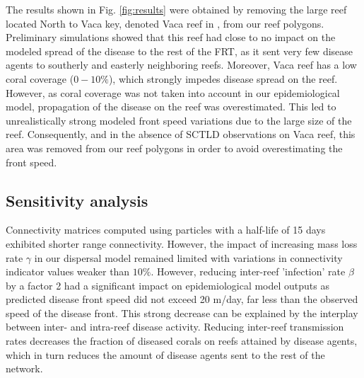 The results shown in Fig. \ref{fig:results} were obtained by removing the large reef located North to Vaca key, denoted Vaca reef in \cite{frys2020fine}, from our reef polygons. Preliminary simulations showed that this reef had close to no impact on the modeled spread of the disease to the rest of the FRT, as it sent very few disease agents to southerly and easterly neighboring reefs. Moreover, Vaca reef has a low coral coverage ($0-10\%$), which strongly impedes disease spread on the reef. However, as coral coverage was not taken into account in our epidemiological model, propagation of the disease on the reef was overestimated. This led to unrealistically strong modeled front speed variations due to the large size of the reef. Consequently, and in the absence of SCTLD observations on Vaca reef, this area was removed from our reef polygons in order to avoid overestimating the front speed.



\subsection{Sensitivity analysis}
Connectivity matrices computed using particles with a half-life of 15 days exhibited shorter range connectivity. However, the impact of increasing mass loss rate $\gamma$ in our dispersal model remained limited with variations in connectivity indicator values weaker than $10\%$. However, reducing inter-reef 'infection' rate $\beta$ by a factor 2 had a significant impact on epidemiological model outputs as predicted disease front speed did not exceed 20 m/day, far less than the observed speed of the disease front. This strong decrease can be explained by the interplay between inter- and intra-reef disease activity. Reducing inter-reef transmission rates decreases the fraction of diseased corals on reefs attained by disease agents, which in turn reduces the amount of disease agents sent to the rest of the network.


